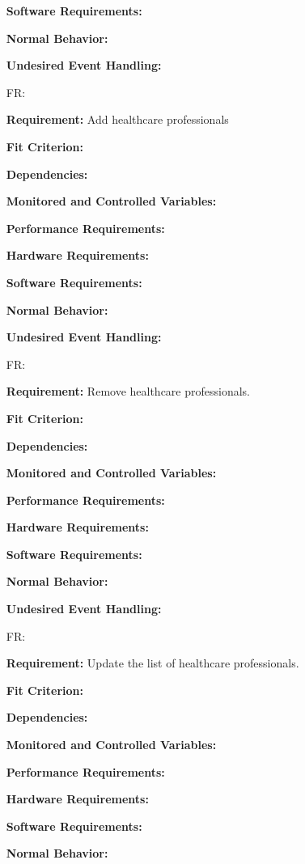 \documentclass[12pt]{article}
\newcounter{reqnum} %
\begin{document}
\begin{itemize}
\textbf{Software Requirements:} 

\textbf{Normal Behavior:} 

\textbf{Undesired Event Handling:} 

\item[FR\refstepcounter{reqnum}\thereqnum \label{FR_meaningfulLabel}:]

\textbf{Requirement:} Add healthcare professionals

\textbf{Fit Criterion:}  

\textbf{Dependencies:}  

\textbf{Monitored and Controlled Variables:} 

\textbf{Performance Requirements:} 

\textbf{Hardware Requirements:} 

\textbf{Software Requirements:} 

\textbf{Normal Behavior:} 

\textbf{Undesired Event Handling:} 

\item[FR\refstepcounter{reqnum}\thereqnum \label{FR_meaningfulLabel}:] 

\textbf{Requirement:} Remove healthcare professionals.

\textbf{Fit Criterion:}  

\textbf{Dependencies:}  

\textbf{Monitored and Controlled Variables:} 

\textbf{Performance Requirements:} 

\textbf{Hardware Requirements:} 

\textbf{Software Requirements:} 

\textbf{Normal Behavior:} 

\textbf{Undesired Event Handling:} 

\item[FR\refstepcounter{reqnum}\thereqnum \label{FR_meaningfulLabel}:] 

\textbf{Requirement:} Update the list of healthcare professionals. 

\textbf{Fit Criterion:}  

\textbf{Dependencies:}  

\textbf{Monitored and Controlled Variables:} 

\textbf{Performance Requirements:} 

\textbf{Hardware Requirements:} 

\textbf{Software Requirements:} 

\textbf{Normal Behavior:} 


\end{itemize}
\end{document}
